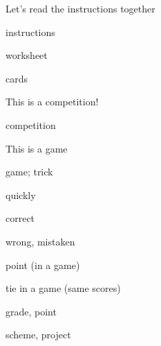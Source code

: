 \documentclass[avery5371,grid,frame]{flashcards}
\begin{document}
\cardfrontfoot{}
\begin{flashcard}{\LARGE Let's read the instructions together}
\LARGE {}
\end{flashcard}
\cardfrontfoot{}
\begin{flashcard}{\LARGE instructions}
\LARGE {}
\end{flashcard}
\cardfrontfoot{}
\begin{flashcard}{\LARGE worksheet}
\LARGE {}
\end{flashcard}
\cardfrontfoot{}
\begin{flashcard}{\LARGE cards}
\LARGE {}
\end{flashcard}
\cardfrontfoot{}
\begin{flashcard}{\LARGE This is a competition!}
\LARGE {}
\end{flashcard}
\cardfrontfoot{}
\begin{flashcard}{\LARGE competition}
\LARGE {}
\end{flashcard}
\cardfrontfoot{}
\begin{flashcard}{\LARGE This is a game}
\LARGE {}
\end{flashcard}
\cardfrontfoot{}
\begin{flashcard}{\LARGE game; trick}
\LARGE {}
\end{flashcard}
\cardfrontfoot{}
\begin{flashcard}{\LARGE quickly}
\LARGE {}
\end{flashcard}
\cardfrontfoot{}
\begin{flashcard}{\LARGE correct}
\LARGE {}
\end{flashcard}
\cardfrontfoot{}
\begin{flashcard}{\LARGE wrong, mistaken}
\LARGE {}
\end{flashcard}
\cardfrontfoot{}
\begin{flashcard}{\LARGE point (in a game)}
\LARGE {}
\end{flashcard}
\cardfrontfoot{}
\begin{flashcard}{\LARGE tie in a game (same scores)}
\LARGE {}
\end{flashcard}
\cardfrontfoot{}
\begin{flashcard}{\LARGE grade, point}
\LARGE {}
\end{flashcard}
\cardfrontfoot{}
\begin{flashcard}{\LARGE scheme, project}
\LARGE {}
\end{flashcard}
\end{document}
